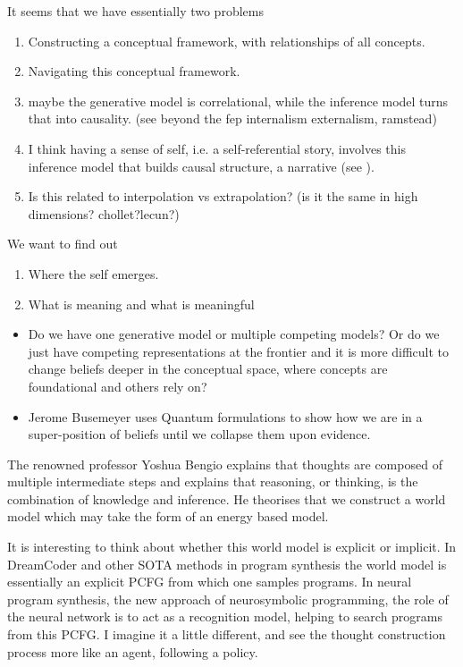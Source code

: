 It seems that we have essentially two problems 
\begin{enumerate}
    \item Constructing a conceptual framework, with relationships of all concepts.
    \item Navigating this conceptual framework. 
    \item maybe the generative model is correlational, while the inference model turns that into causality. (see beyond the fep internalism externalism, ramstead)
    \item I think having a sense of self, i.e. a self-referential story, involves this inference model that builds causal structure, a narrative (see \cite{bouizegarene_narrative_2020}).
    \item Is this related to interpolation vs extrapolation? (is it the same in high dimensions? chollet?lecun?)
\end{enumerate}

We want to find out

\begin{enumerate}
    \item Where the self emerges.
    \item What is meaning and what is meaningful
\end{enumerate}


\begin{itemize}
    \item Do we have one generative model or multiple competing models? Or do we just have competing representations at the frontier and it is more difficult to change beliefs deeper in the conceptual space, where concepts are foundational and others rely on?
    \item Jerome Busemeyer uses Quantum formulations to show how we are in a super-position of beliefs until we collapse them upon evidence. 
\end{itemize}

The renowned professor Yoshua Bengio explains that thoughts are composed of multiple intermediate steps and explains that reasoning, or thinking, is the combination of knowledge and inference. 
He theorises that we construct a world model which may take the form of an energy based model.

It is interesting to think about whether this world model is explicit or implicit. In DreamCoder and other SOTA methods in program synthesis the world model is essentially an explicit PCFG from which one samples programs. In neural program synthesis, the new approach of neurosymbolic programming, the role of the neural network is to act as a recognition model, helping to search programs from this PCFG.
I imagine it a little different, and see the thought construction process more like an agent, following a policy.

